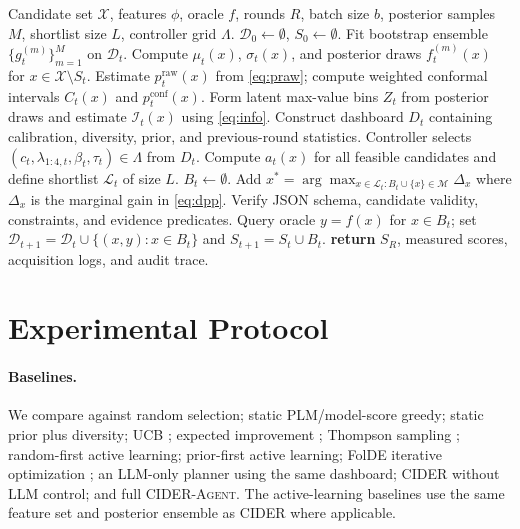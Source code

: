 \documentclass{article}
\newcommand{\method}{\textsc{CIDER}}
\newcommand{\agent}{\textsc{CIDER-Agent}}
\newcommand{\xset}{\mathcal X}
\newcommand{\dset}{\mathcal D}
\newcommand{\mcal}{\mathcal M}
\begin{document}
\begin{algorithm}[t]
\caption{\agent{} for one assay}
\label{alg:cider}
\small
\begin{algorithmic}[1]
\REQUIRE Candidate set $\xset$, features $\phi$, oracle $f$, rounds $R$, batch size $b$, posterior samples $M$, shortlist size $L$, controller grid $\Lambda$.
\STATE $\dset_0\leftarrow\emptyset$, $S_0\leftarrow\emptyset$.
  \STATE Fit bootstrap ensemble $\{g_t^{(m)}\}_{m=1}^{M}$ on $\dset_t$.
  \STATE Compute $\mu_t(x)$, $\sigma_t(x)$, and posterior draws $f_t^{(m)}(x)$ for $x\in\xset\setminus S_t$.
  \STATE Estimate $p_t^{\mathrm{raw}}(x)$ from \cref{eq:praw}; compute weighted conformal intervals $C_t(x)$ and $p_t^{\mathrm{conf}}(x)$.
  \STATE Form latent max-value bins $Z_t$ from posterior draws and estimate $\mathcal I_t(x)$ using \cref{eq:info}.
  \STATE Construct dashboard $D_t$ containing calibration, diversity, prior, and previous-round statistics.
  \STATE Controller selects $(c_t,\lambda_{1:4,t},\beta_t,\tau_t)\in\Lambda$ from $D_t$.
  \STATE Compute $a_t(x)$ for all feasible candidates and define shortlist $\mathcal L_t$ of size $L$.
  \STATE $B_t\leftarrow\emptyset$.
    \STATE Add $x^*=\arg\max_{x\in\mathcal L_t: B_t\cup\{x\}\in\mcal}\Delta_x$ where $\Delta_x$ is the marginal gain in \cref{eq:dpp}.
  \ENDWHILE
  \STATE Verify JSON schema, candidate validity, constraints, and evidence predicates.
  \STATE Query oracle $y=f(x)$ for $x\in B_t$; set $\dset_{t+1}=\dset_t\cup\{(x,y):x\in B_t\}$ and $S_{t+1}=S_t\cup B_t$.
\ENDFOR
\STATE \textbf{return} $S_R$, measured scores, acquisition logs, and audit trace.
\end{algorithmic}
\end{algorithm}

\section{Experimental Protocol}
\label{sec:experiments}

\paragraph{Baselines.} We compare against random selection; static PLM/model-score greedy; static prior plus diversity; UCB \citep{auer2002ucb}; expected improvement \citep{jones1998ego}; Thompson sampling \citep{russo2018tutorial}; random-first active learning; prior-first active learning; FolDE iterative optimization \citep{roberts2025folde}; an LLM-only planner using the same dashboard; \method{} without LLM control; and full \agent{}. The active-learning baselines use the same feature set and posterior ensemble as \method{} where applicable.
\end{document}

